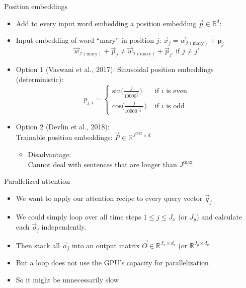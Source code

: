 \begin{vbframe}{Position embeddings}

\vfill

\begin{itemize}
\item Add to every input word embedding a position embedding $\vec {p} \in \mathbb{R}^d$:
\item Input embedding of word ``mary'' in position $j$: $\vec {x}_j = \vec {w}_{\mathcal{I}(\text{mary})} + \mathbf{p}_j$
$$\vec {w}_{\mathcal{I}(\text{mary})} + \vec {p}_j \neq \vec{w}_{\mathcal{I}(\text{mary})} + \vec {p}_{j'} \text{ if } j \neq j'$$
\item Option 1 (Vaswani et al., 2017): Sinusoidal position embeddings (deterministic): 
$$p_{j,i} = \begin{cases} \mathrm{sin}\big(\frac{j}{10000^\frac{i}{d}}\big)  & \text{ if } i \text{ is even} \\ \mathrm{cos}\big(\frac{j}{10000^\frac{i-1}{d}}\big) & \text{ if } i \text{ is odd}  \end{cases}$$
\item Option 2 (Devlin et al., 2018):\\Trainable position embeddings: $\vec {P} \in \mathbb{R}^{J^\mathrm{max} \times d}$
\begin{itemize}
\item Disadvantage:\\Cannot deal with sentences that are longer than $J^\mathrm{max}$
\end{itemize}
\end{itemize}

\vfill

\end{vbframe}


\begin{vbframe}{Parallelized attention}

\vfill

\begin{itemize}
\item We want to apply our attention recipe to every query vector $\vec q_j$
\item We could simply loop over all time steps $1 \leq j \leq J_x$ (or $J_y$) and calculate each $\vec o_j$ independently.
\item Then stack all $\vec o_j$ into an output matrix $\vec O \in \mathbb{R}^{J_x \times d_v}$ (or $\mathbb{R}^{J_y \times d_v}$
\item But a loop does not use the GPU's capacity for parallelization
\item So it might be unnecessarily slow
\end{itemize}

\vfill

\end{vbframe}


